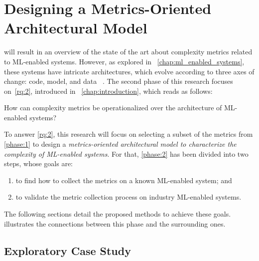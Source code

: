   \section{Designing a Metrics-Oriented Architectural Model}
  \label{sec:methodology_phase_3}
  \MethodologyPhase

   will result in an overview of the state of the art about
  complexity metrics related to ML-enabled systems. However, as explored in%
  ~\cref{chap:ml_enabled_systems}, these systems have intricate architectures,
  which evolve according to three axes of change: code, model, and data
  ~\parencite{Alves2024PracticesReview,Sato2019ContinuousLearning}.
  The second phase of this research focuses on~\cref{rq:2}, introduced in%
  ~\cref{chap:introduction}, which reads as follows:
  \begin{revisitresearchquestion}{2}
    How can complexity metrics be operationalized over
    the architecture of ML-enabled systems?
  \end{revisitresearchquestion}

  To answer \cref{rq:2}, this research will focus on selecting a subset of the
  metrics from \cref{phase:1} to design a \emph{metrics-oriented
  architectural model to characterize the complexity of ML-enabled systems}.
  For that, \cref{phase:2} has been divided into two steps, whose goals are:
  \begin{enumerate}[label=\theMethPhase.\arabic*.]
      \item to find how to collect the metrics on a known ML-enabled system; and
      \item to validate the metric collection process on industry ML-enabled systems.
  \end{enumerate}
  The following sections detail the proposed methods to achieve these goals.%
  ~ illustrates the connections between this
  phase and the surrounding ones.

  \subsection{Exploratory Case Study}
  \MethodologyStep


